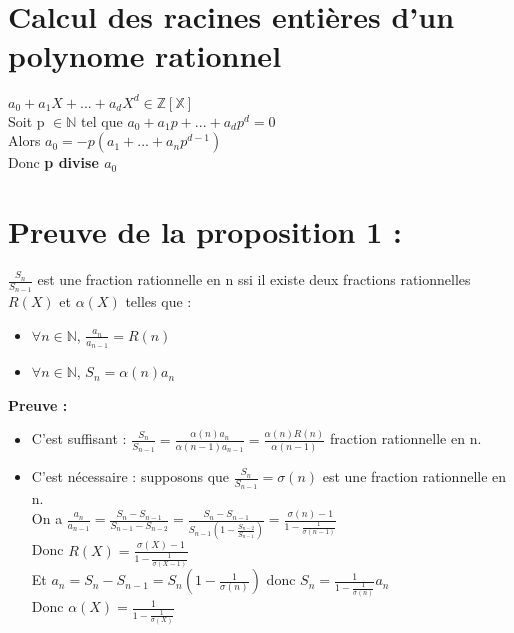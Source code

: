 \documentclass[17 pt,french]{scrartcl}
\begin{document}
	\section*{Calcul des racines entières d'un polynome rationnel}
	$a_0 + a_1X + ... + a_dX^d \in \mathbb{Z[X]}$\\
	Soit p $\in \mathbb{N}$ tel que $a_0 + a_1p + ... + a_dp^d = 0$\\
	Alors $a_0 = -p(a_1 + ... + a_np^{d-1})$\\
	Donc \textbf{p divise $a_0$}
	\section*{Preuve de la proposition 1 : }
	$\frac{S_n}{S_{n-1}}$ est une fraction rationnelle en n ssi il existe deux fractions rationnelles $R(X)$ et $\alpha(X)$ telles que : 
	 \begin{itemize}
	 \item $\forall n \in \mathbb{N}$, $\frac{a_n}{a_{n-1}} = R(n)$
	 \item $\forall n \in \mathbb{N}$, $S_n = \alpha(n)a_n$
	 \end{itemize}
	 \textbf{Preuve : }\\
	 \begin{itemize}
	 \item C'est suffisant : $\frac{S_n}{S_{n-1}} = \frac{\alpha(n)a_n}{\alpha(n-1)a_{n-1}} = \frac{\alpha(n)R(n)}{\alpha(n-1)}$ fraction rationnelle en n.
	 \item C'est nécessaire : supposons que $\frac{S_n}{S_{n-1}} = \sigma(n)$ est une fraction rationnelle en n.\\
	 On a $\frac{a_n}{a_{n-1}} = \frac{S_n-S_{n-1}}{S_{n-1}-S_{n-2}} = \frac{S_n-S_{n-1}}{S_{n-1}(1-\frac{S_{n-2}}{S_{n-1}})} = \frac{\sigma(n)-1}{1-\frac{1}{\sigma(n-1)}}$ \\
	 Donc $R(X) = \frac{\sigma(X)-1}{1-\frac{1}{\sigma(X-1)}}$\\
	 Et $a_n = S_n-S_{n-1} = S_n(1-\frac{1}{\sigma(n)})$ donc $S_n = \frac{1}{1-\frac{1}{\sigma(n)}}a_n$\\
	 Donc $\alpha(X) =  \frac{1}{1-\frac{1}{\sigma(X)}}$
	 \end{itemize}
	 
	 
	 
	 
	 
	 
	 
	\newpage
\end{document}
